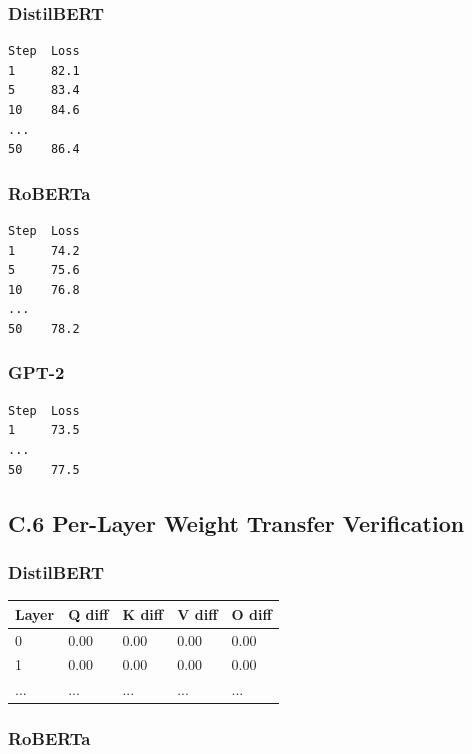 \subsubsection{DistilBERT}

\begin{lstlisting}
Step  Loss
1     82.1
5     83.4
10    84.6
...
50    86.4
\end{lstlisting}

\subsubsection{RoBERTa}

\begin{lstlisting}
Step  Loss
1     74.2
5     75.6
10    76.8
...
50    78.2
\end{lstlisting}

\subsubsection{GPT-2}

\begin{lstlisting}
Step  Loss
1     73.5
...
50    77.5
\end{lstlisting}

\subsection{C.6 Per-Layer Weight Transfer Verification}

\subsubsection{DistilBERT}

\begin{table}[H]
\centering
\small
\begin{tabular}{lllll}
\toprule
\textbf{Layer} & \textbf{Q diff} & \textbf{K diff} & \textbf{V diff} & \textbf{O diff} \\
\midrule
0 & 0.00 & 0.00 & 0.00 & 0.00 \\
1 & 0.00 & 0.00 & 0.00 & 0.00 \\
... & ... & ... & ... & ... \\
\bottomrule
\end{tabular}
\end{table}

\subsubsection{RoBERTa}

